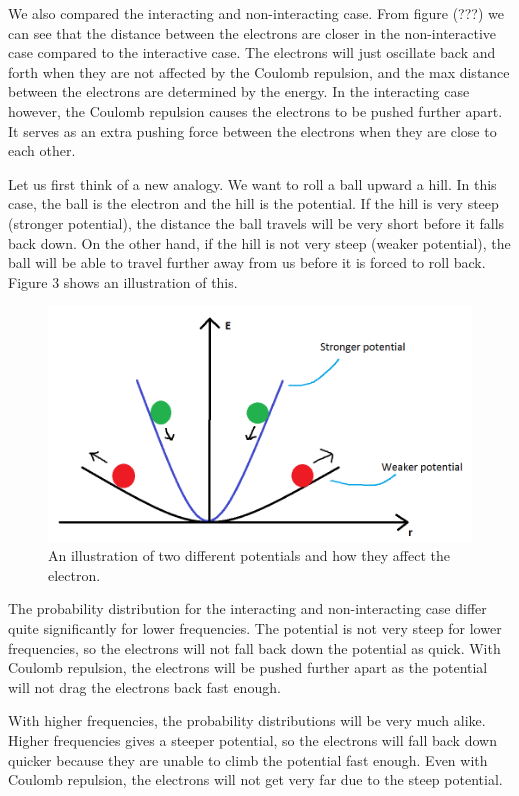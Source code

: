 \documentclass[12pt]{article}
\begin{document}
We also compared the interacting and non-interacting case. From figure (???) we can see that the distance between the electrons are closer in the non-interactive case compared to the interactive case. The electrons will just oscillate back and forth when they are not affected by the Coulomb repulsion, and the max distance between the electrons are determined by the energy. In the interacting case however, the Coulomb repulsion causes the electrons to be pushed further apart. It serves as an extra pushing force between the electrons when they are close to each other.

Let us first think of a new analogy. We want to roll a ball upward a hill. In this case, the ball is the electron and the hill is the potential. If the hill is very steep (stronger potential), the distance the ball travels will be very short before it falls back down. On the other hand, if the hill is not very steep (weaker potential), the ball will be able to travel further away from us before it is forced to roll back. Figure 3 shows an illustration of this.
\begin{figure}[hbtp]
\centering
\includegraphics[width=\linewidth]{Potential_illustration2.png}
\caption{An illustration of two different potentials and how they affect the electron.}
\end{figure}

The probability distribution for the interacting and non-interacting case differ quite significantly for lower frequencies. The potential is not very steep for lower frequencies, so the electrons will not fall back down the potential as quick. With Coulomb repulsion, the electrons will be pushed further apart as the potential will not drag the electrons back fast enough.

With higher frequencies, the probability distributions will be very much alike. Higher frequencies gives a steeper potential, so the electrons will fall back down quicker because they are unable to climb the potential fast enough. Even with Coulomb repulsion, the electrons will not get very far due to the steep potential.
\end{document}
